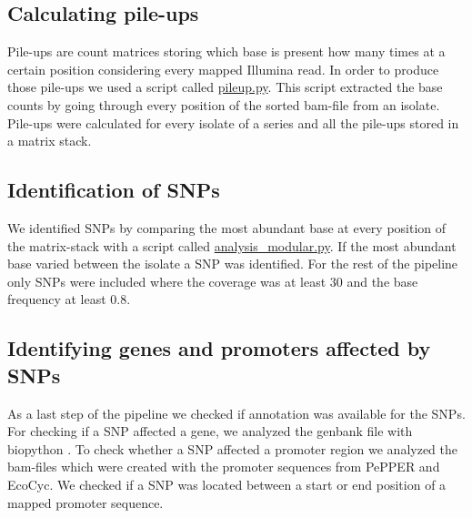 \subsection{Calculating pile-ups}
Pile-ups are count matrices storing which base is present how many times at a certain position considering every mapped Illumina read. In order to produce those pile-ups we used a script called \href{https://github.com/nahanoo/ESBL_project}{pileup.py}. This script extracted the base counts by going through every position of the sorted bam-file from an isolate. Pile-ups were calculated for every isolate of a series and all the pile-ups stored in a matrix stack.

\subsection{Identification of SNPs} 
We identified SNPs by comparing the most abundant base at every position of the matrix-stack with a script called \href{https://github.com/nahanoo/ESBL\_project}{analysis\_modular.py}. If the most abundant base varied between the isolate a SNP was identified. For the rest of the pipeline only SNPs were included where the coverage was at least 30 and the base frequency at least 0.8.

\subsection{Identifying genes and promoters affected by SNPs}
As a last step of the pipeline we checked if annotation was available for the SNPs. For checking if a SNP affected a gene, we analyzed the genbank file with biopython \cite{cock_biopython:_2009}. To check whether a SNP affected a promoter region we analyzed the bam-files which were created with the promoter sequences from PePPER and EcoCyc. We checked if a SNP was located between a start or end position of a mapped promoter sequence. 

